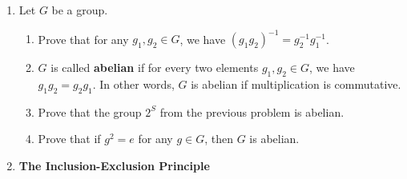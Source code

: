 \documentclass[../main.tex]{subfiles}
\begin{document}
\begin{enumerate}
\begin{proof}
\begin{figure}
            \caption{Power set group associativity.}
            \label{fig:2S-associativity}
        \end{figure}\par
        To confirm that the identity element is the $\emptyset$, it will suffice to show that $A\triangle\emptyset=\emptyset\triangle A=A$ for all $A\in 2^S$. Let $A$ be an arbitrary element of $2^S$. Then
        \begin{align*}
            A\triangle\emptyset &= (A\cup\emptyset)\setminus(A\cap\emptyset)\\
            &= A\setminus\emptyset\\
            &= A\\
            &= A\setminus\emptyset\\
            &= (\emptyset\cup A)\setminus(\emptyset\cap A)\\
            &= \emptyset\triangle A
        \end{align*}
        as desired.\par
        To confirm $A=A^{-1}$, we must show that $A\triangle A=\emptyset$. But we have that
        \begin{align*}
            A\triangle A &= (A\cup A)\setminus(A\cap A)\\
            &= A\setminus A\\
            &= \emptyset
        \end{align*}
        as desired.
    \end{proof}
    \item Let $G$ be a group.
    \begin{enumerate}
        \item Prove that for any $g_1,g_2\in G$, we have $(g_1g_2)^{-1}=g_2^{-1}g_1^{-1}$.
        \item $G$ is called \textbf{abelian} if for every two elements $g_1,g_2\in G$, we have $g_1g_2=g_2g_1$. In other words, $G$ is abelian if multiplication is commutative.
        \item Prove that the group $2^S$ from the previous problem is abelian.
        \item Prove that if $g^2=e$ for any $g\in G$, then $G$ is abelian.
    \end{enumerate}
    \item \textbf{The Inclusion-Exclusion Principle}\par

\end{enumerate}
\end{document}
